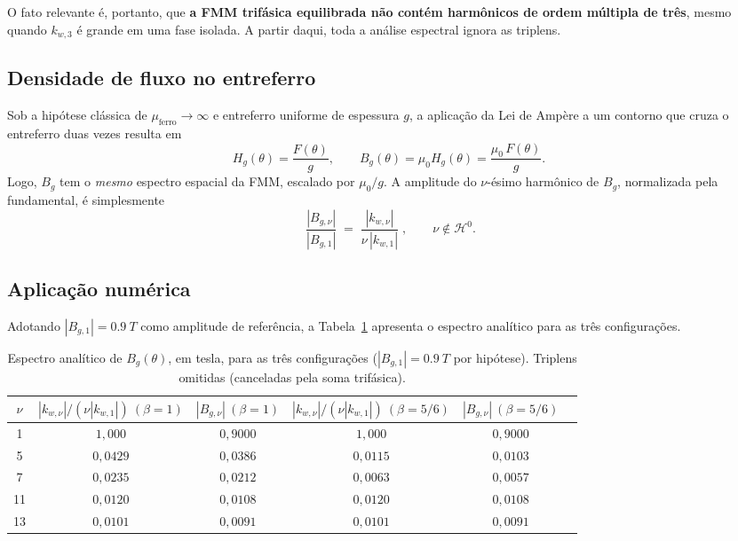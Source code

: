 \documentclass[12pt,a4paper]{article}
\newcommand{\eqimp}[1]{\boxed{\,#1\,}}
\begin{document}
\noindent O fato relevante é, portanto, que \textbf{a FMM trifásica equilibrada não contém harmônicos de ordem múltipla de três}, mesmo quando $k_{w,3}$ é grande em uma fase isolada. A partir daqui, toda a análise espectral ignora as triplens.

\subsection{Densidade de fluxo no entreferro}

Sob a hipótese clássica de $\mu_{\text{ferro}} \to \infty$ e entreferro uniforme de espessura $g$, a aplicação da Lei de Ampère a um contorno que cruza o entreferro duas vezes resulta em
\begin{equation}
H_g(\theta) = \frac{F(\theta)}{g}, \qquad B_g(\theta) = \mu_0 H_g(\theta) = \frac{\mu_0\,F(\theta)}{g}.
\end{equation}
Logo, $B_g$ tem o \emph{mesmo} espectro espacial da FMM, escalado por $\mu_0/g$. A amplitude do $\nu$-ésimo harmônico de $B_g$, normalizada pela fundamental, é simplesmente
\begin{equation}
\eqimp{\;\frac{|B_{g,\nu}|}{|B_{g,1}|} \;=\; \frac{|k_{w,\nu}|}{\nu\,|k_{w,1}|}\;,\qquad \nu \notin \mathcal{H}^0.}
\label{eq:espectro}
\end{equation}

\subsection{Aplicação numérica}

Adotando $|B_{g,1}| = \SI{0.9}{T}$ como amplitude de referência, a Tabela~\ref{tab:espectro} apresenta o espectro analítico para as três configurações.

\begin{table}[h]
\centering
\caption{Espectro analítico de $B_g(\theta)$, em tesla, para as três configurações ($|B_{g,1}|=\SI{0.9}{T}$ por hipótese). Triplens omitidas (canceladas pela soma trifásica).}
\label{tab:espectro}
\renewcommand{\arraystretch}{1.15}
\begin{tabular}{c c c c c c}
\toprule
$\nu$ & $|k_{w,\nu}|/(\nu|k_{w,1}|)\ (\beta=1)$ & $|B_{g,\nu}|\ (\beta=1)$ &
        $|k_{w,\nu}|/(\nu|k_{w,1}|)\ (\beta=5/6)$ & $|B_{g,\nu}|\ (\beta=5/6)$ \\
\midrule
1  & $1{,}000$ & $0{,}9000$ & $1{,}000$ & $0{,}9000$ \\
5  & $0{,}0429$ & $0{,}0386$ & $0{,}0115$ & $0{,}0103$ \\
7  & $0{,}0235$ & $0{,}0212$ & $0{,}0063$ & $0{,}0057$ \\
11 & $0{,}0120$ & $0{,}0108$ & $0{,}0120$ & $0{,}0108$ \\
13 & $0{,}0101$ & $0{,}0091$ & $0{,}0101$ & $0{,}0091$ \\
\bottomrule
\end{tabular}
\end{table}
\end{document}
